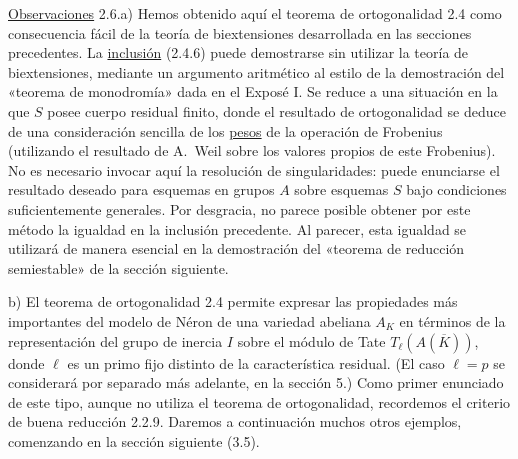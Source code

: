 \medskip
\noindent
\underline{Observaciones} 2.6.\quad a) Hemos obtenido aquí el teorema
de ortogonalidad 2.4 como consecuencia fácil de la teoría de
biextensiones desarrollada en las secciones precedentes. La
\underline{inclusión} (2.4.6) puede demostrarse sin utilizar la teoría
de biextensiones, mediante un argumento aritmético al estilo de la
demostración del «teorema de monodromía» dada en el Exposé I. Se reduce
a una situación en la que $S$ posee cuerpo residual finito, donde el
resultado de ortogonalidad se deduce de una consideración sencilla de
los \underline{pesos} de la operación de Frobenius (utilizando el
resultado de A.~Weil sobre los valores propios de este Frobenius). No
es necesario invocar aquí la resolución de singularidades: puede
enunciarse el resultado deseado para esquemas en grupos $A$ sobre
esquemas $S$ bajo condiciones suficientemente generales. Por desgracia,
no parece posible obtener por este método la igualdad en la inclusión
precedente. Al parecer, esta igualdad se utilizará de manera esencial
en la demostración del «teorema de reducción semiestable» de la sección
siguiente.

\smallskip
\noindent
b) El teorema de ortogonalidad 2.4 permite expresar las propiedades más
importantes del modelo de Néron de una variedad abeliana $A_K$ en
términos de la representación del grupo de inercia $I$ sobre el módulo
de Tate $T_\ell(A(\overline K))$, donde $\ell$ es un primo fijo distinto
de la característica residual. (El caso $\ell=p$ se considerará por
separado más adelante, en la sección 5.) Como primer enunciado de este
tipo, aunque no utiliza el teorema de ortogonalidad, recordemos el
criterio de buena reducción 2.2.9. Daremos a continuación muchos otros
ejemplos, comenzando en la sección siguiente (3.5).
